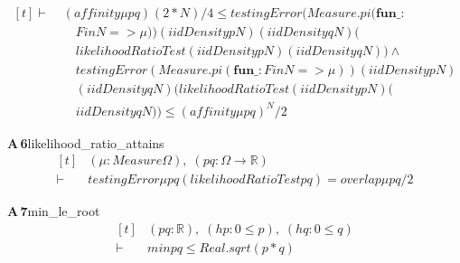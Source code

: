 \documentclass[conference]{IEEEtran}
\theoremstyle{definition}
\newcommand{\lean}[1]{\textsf{\footnotesize #1}}
\begin{document}
{\[\begin{aligned}[t]
\vdash\;&(\mathit{affinity} \mu \mathit{p} \mathit{q})^{}(2*\mathit{N})/4 \leq \mathit{testingError} (\mathit{Measure}.\mathit{pi} (\mathbf{fun} \mathit{\_} :\\
&\quad \mathit{Fin} \mathit{N} => \mu )) (\mathit{iidDensity} \mathit{p} \mathit{N}) (\mathit{iidDensity} \mathit{q} \mathit{N}) (\\
&\quad \mathit{likelihoodRatioTest} (\mathit{iidDensity} \mathit{p} \mathit{N}) (\mathit{iidDensity} \mathit{q} \mathit{N})) \wedge\\
&\quad \mathit{testingError} (\mathit{Measure}.\mathit{pi} (\mathbf{fun} \mathit{\_} : \mathit{Fin} \mathit{N} => \mu )) (\mathit{iidDensity} \mathit{p} \mathit{N})\\
&\quad (\mathit{iidDensity} \mathit{q} \mathit{N}) (\mathit{likelihoodRatioTest} (\mathit{iidDensity} \mathit{p} \mathit{N}) (\\
&\quad \mathit{iidDensity} \mathit{q} \mathit{N})) \leq (\mathit{affinity} \mu \mathit{p} \mathit{q})^{\mathit{N}}/2
\end{aligned} \]}

\noindent\textbf{A\,6}\quad\lean{likelihood\_ratio\_attains}
{\footnotesize\[ \begin{aligned}[t]
&(\mu : \mathit{Measure} \Omega ),\; (\mathit{p} \mathit{q} : \Omega \to \mathbb{R} )\\
\vdash\;&\mathit{testingError} \mu \mathit{p} \mathit{q} (\mathit{likelihoodRatioTest} \mathit{p} \mathit{q}) = \mathit{overlap} \mu \mathit{p} \mathit{q}/2
\end{aligned} \]}

\noindent\textbf{A\,7}\quad\lean{min\_le\_root}
{\footnotesize\[ \begin{aligned}[t]
&(\mathit{p} \mathit{q} : \mathbb{R} ),\; (\mathit{hp} : 0 \leq \mathit{p}),\; (\mathit{hq} : 0 \leq \mathit{q})\\
\vdash\;&\mathit{min} \mathit{p} \mathit{q} \leq \mathit{Real}.\mathit{sqrt} (\mathit{p}*\mathit{q})
\end{aligned} \]}
\end{document}

